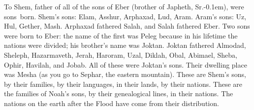 \begin{inparaenum}
     To Shem, father of all of the sons of Eber (brother of Japheth, Sr.\kern-0.1em), were sons\understood\ born.%
     Shem's sons: Elam, Asshur, Arphaxad, Lud, Aram.%
     Aram's sons: Uz, Hul, Gether, Mash.%
     Arphaxad fathered Salah, and Salah fathered Eber.%
     Two sons were born to Eber: the name of the first was Peleg because in his lifetime the nations were divided; his brother's name was Joktan.%
     Joktan fathered Almodad, Sheleph, Hazarmaveth, Jerah,%
     Haroram, Uzal, Diklah,%
     Obal, Abimael, Sheba,%
     Ophir, Havilah, and Jobab. All of these were Joktan's sons.%
     Their dwelling place was Mesha (as you go to Sephar, the eastern mountain).%
     These are Shem's sons, by their families, by their languages, in their lands, by their nations.%
     These are the families of Noah's sons, by their genealogical lines, in their nations. The nations on the earth after the Flood have come from their distribution.%
\end{inparaenum}
